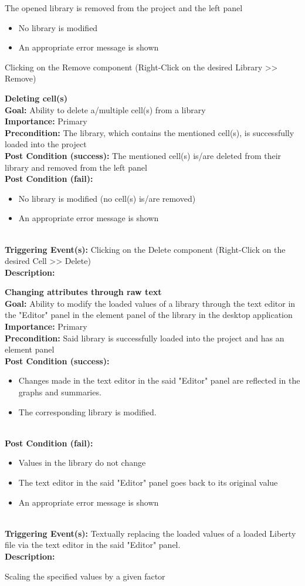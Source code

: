 \documentclass[10pt,a4paper]{report}
\newcommand{\precondition}[1]{
    \textbf{Precondition: } #1 \leavevmode \\
}
\newcommand{\FRDescription}[8]{
    \textbf{#1} \leavevmode \\
    \textbf{Goal: } #2 \leavevmode \\
    \textbf{Importance: } #3 \leavevmode \\
    \precondition{#4}
    \textbf{Post Condition (success): } #5 \leavevmode \\
    \textbf{Post Condition (fail): } #6 \leavevmode \\
    \textbf{Triggering Event(s): } #7 \leavevmode \\
    \textbf{Description: } \leavevmode \\ 
    #8}
\begin{document}
\begin{FR}
    {The opened library is removed from the project and the left panel}
    {\begin{itemize}
        \item No library is modified
        \item An appropriate error message is shown
    \end{itemize}}
    {Clicking on the Remove component (Right-Click on the desired Library  >> Remove)}
    \item \FRDescription{Deleting cell(s)}
    {Ability to delete a/multiple cell(s) from a library}
    {Primary}
    {The library, which contains the mentioned cell(s), is successfully loaded into the project}
    {The mentioned cell(s) is/are deleted from their library and removed from the left panel}
    {\begin{itemize}
        \item No library is modified (no cell(s) is/are removed)
        \item An appropriate error message is shown
    \end{itemize}}
    {Clicking on the Delete component (Right-Click on the desired Cell  >> Delete)}
    \item \FRDescription{Changing attributes through raw text}
    {Ability to modify the loaded values of a library through the text editor in the "Editor" panel in the element panel of the library in the desktop application}
    {Primary}
    {Said library is successfully loaded into the project and has an element panel}
    {\begin{itemize}
        \item Changes made in the text editor in the said "Editor" panel are reflected in the graphs and summaries.
        \item The corresponding library is modified.
    \end{itemize}}
    {\begin{itemize}
        \item Values in the library do not change
        \item The text editor in the said "Editor" panel goes back to its original value
        \item An appropriate error message is shown
    \end{itemize}}
    {Textually replacing the loaded values of a loaded Liberty file via the text editor in the said "Editor" panel.}
    \item {}
    {Scaling the specified values by a given factor}

\end{FR}
\end{document}
